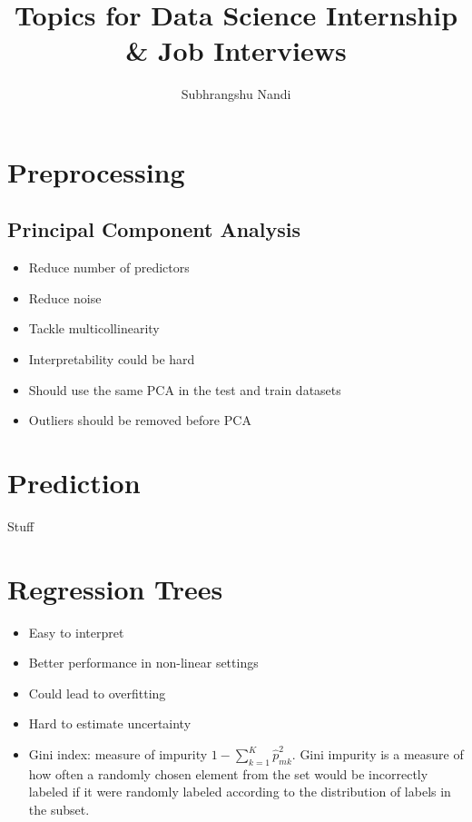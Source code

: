 \documentclass[11pt]{extarticle} %
\begin{document}
\title{Topics for Data Science Internship \& Job Interviews}
\author{Subhrangshu Nandi}
\date{}

\maketitle

\tableofcontents
\newpage

\section{Preprocessing}
\subsection{Principal Component Analysis}
\begin{itemize}
\item Reduce number of predictors
\item Reduce noise
\item Tackle multicollinearity
\item Interpretability could be hard
\item Should use the same PCA in the test and train datasets
\item Outliers should be removed before PCA
\end{itemize}


\section{Prediction}
Stuff

\section{Regression Trees}
\begin{itemize}
\item Easy to interpret
\item Better performance in non-linear settings
\item Could lead to overfitting
\item Hard to estimate uncertainty
\item Gini index: measure of impurity $1 - \sum\limits_{k = 1}^{K} \hat{p}^2_{mk}$. Gini impurity is a measure of how often a randomly chosen element from the set would be incorrectly labeled if it were randomly labeled according to the distribution of labels in the subset. 
\end{itemize}
\end{document}
